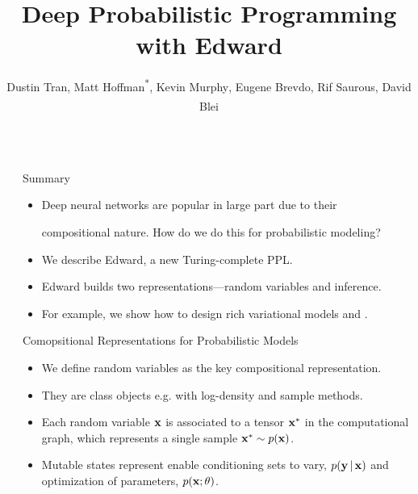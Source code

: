 \documentclass[final]{beamer}
\title{Deep Probabilistic Programming with Edward}
\author{Dustin Tran\textsuperscript{\textdagger},
Matt Hoffman\textsuperscript{*}\textsuperscript{\ddag},
Kevin Murphy\textsuperscript{\ddag},
Eugene Brevdo\textsuperscript{\ddag},
Rif Saurous\textsuperscript{\ddag},
David Blei\textsuperscript{\textdagger}}
\institute{
\textsuperscript{\textdagger}Columbia University,
\textsuperscript{*}Adobe Research,
\textsuperscript{\ddag}Google
}
\begin{document}
\begin{frame}[t]
\begin{columns}[t]

\begin{column}{\sepwid}\end{column} %

\begin{column}{\onecolwid}

\begin{alertblock}{Summary}
\begin{itemize}
  \item
Deep neural networks are popular in large part due to their

compositional nature. How do we do this for
probabilistic modeling?
  \item We describe
Edward, a new Turing-complete \acrlong{PPL}.
\item Edward builds
two representations---random variables and
inference.
\item
For example, we show how to design rich variational models and .
\end{itemize}
\end{alertblock}

\begin{block}{Comopsitional Representations for Probabilistic Models}
\begin{itemize}
\item
We define random variables as the key compositional representation.
\item
They are class objects e.g. with log-density and sample methods.
\item
Each random variable $\boldsymbol{\mathbf{x}}$ is associated to a
tensor $\boldsymbol{\mathbf{x}}^*$ in the computational graph, which represents a single
sample $\boldsymbol{\mathbf{x}}^*\sim p(\boldsymbol{\mathbf{x}})$.
\item
Mutable states represent enable conditioning sets to vary,
$p(\boldsymbol{\mathbf{y}}\,|\,\boldsymbol{\mathbf{x}})$ and optimization of parameters, $p(\boldsymbol{\mathbf{x}}; \theta)$.
\end{itemize}
\end{block}


\end{column}
\end{columns}
\end{frame}
\end{document}
